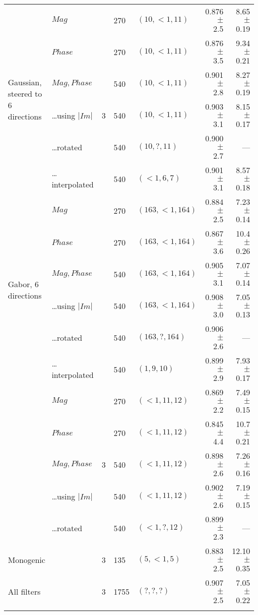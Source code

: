 \begin{tabularx}{\linewidth}{p{3cm} X X X X r r}
\midrule
\multirow{6}{2cm}{Gaussian, steered to 6 directions}
        & $Mag$                     & \multirow{7}{1cm}{ 3 }
                                    &    270 &$(10, {<}1, 11)$    & 0.876 $\pm$ 2.5   & 8.65 $\pm$ 0.19 \\
        & $Phase$                   &&   270 &$(10, {<}1, 11)$    & 0.876 $\pm$ 3.5   & 9.34 $\pm$ 0.21 \\
        & $Mag, Phase$              &&   540 &$(10, {<}1, 11)$    & 0.901 $\pm$ 2.8   & 8.27 $\pm$ 0.19 \\
        & \ldots using $|Im|$       &&   540 &$(10, {<}1, 11)$    & 0.903 $\pm$ 3.1   & 8.15 $\pm$ 0.17 \\
        & \ldots rotated            &&   540 &$(10, ?, 11)$       & 0.900 $\pm$ 2.7   & --- \\
        & \ldots interpolated       &&   540 &$({<}1, 6, 7)$      & 0.901 $\pm$ 3.1   & 8.57 $\pm$ 0.18 \\
\midrule
\multirow{6}{2cm}{Gabor, 6 directions}
        & $Mag$                     & \multirow{7}{1cm}{ 3 }
                                    &    270 &$(163, {<}1, 164)$  & 0.884 $\pm$ 2.5   & 7.23 $\pm$ 0.14 \\
        & $Phase$                   &&   270 &$(163, {<}1, 164)$  & 0.867 $\pm$ 3.6   &10.4 $\pm$ 0.26 \\
        & $Mag,Phase$               &&   540 &$(163, {<}1, 164)$  & 0.905 $\pm$ 3.1   & 7.07 $\pm$ 0.14 \\
        & \ldots using $|Im|$       &&   540 &$(163, {<}1, 164)$  & 0.908 $\pm$ 3.0   & 7.05 $\pm$ 0.13 \\
        & \ldots rotated            &&   540 &$(163, ?, 164)$   & 0.906 $\pm$ 2.6   & --- \\
        & \ldots interpolated       &&   540 &$(1, 9, 10)$      & 0.899 $\pm$ 2.9   & 7.93 $\pm$ 0.17 \\
\midrule
\multirow{5}{2cm}{\dtcwt{}}
        & $Mag$                     & \multirow{5}{1cm}{ 3 }
                                    &    270 & $({<}1, 11, 12)$   & 0.869 $\pm$ 2.2   & 7.49 $\pm$ 0.15 \\
        & $Phase$                   &&   270 & $({<}1, 11, 12)$   & 0.845 $\pm$ 4.4   & 10.7 $\pm$ 0.21 \\
        & $Mag,Phase$               &&   540 & $({<}1, 11, 12)$   & 0.898 $\pm$ 2.6   & 7.26 $\pm$ 0.16 \\
        & \ldots using $|Im|$       &&   540 & $({<}1, 11, 12)$   & 0.902 $\pm$ 2.6   & 7.19 $\pm$ 0.15 \\
        & \ldots rotated            &&   540 & $({<}1, ?, 12)$    & 0.899 $\pm$ 2.3   & --- \\
\midrule
\multicolumn{2}{l}{Monogenic}       & \multirow{1}{1cm}{ 3 }
                                    &    135 &$(5, {<}1, 5)$      & 0.883 $\pm$ 2.5   &12.10 $\pm$ 0.35 \\
\midrule
\multicolumn{2}{l}{All filters}     & \multirow{1}{1cm}{ 3 }
                                    &   1755 &$(?, ?, ?)$       & 0.907 $\pm$ 2.5   & 7.05 $\pm$ 0.22 \\

\bottomrule
\noalign{\smallskip}
\end{tabularx}
